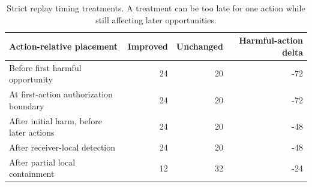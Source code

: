 \begin{table}[t]\centering\small
\caption{Strict replay timing treatments. A treatment can be too late for one action while still affecting later opportunities.}
\begin{tabular}{@{}p{}rrr@{}}\toprule
Action-relative placement & Improved & Unchanged & Harmful-action delta \\ \midrule
Before first harmful opportunity & 24 & 20 & -72 \\
At first-action authorization boundary & 24 & 20 & -72 \\
After initial harm, before later actions & 24 & 20 & -48 \\
After receiver-local detection & 24 & 20 & -48 \\
After partial local containment & 12 & 32 & -24 \\ \bottomrule
\end{tabular}\label{tab:timing}\end{table}
